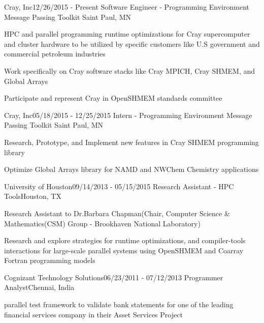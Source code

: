 \begin{rSubsection}{Cray, Inc}{12/26/2015 - Present}
                   {Software Engineer - Programming Environment Message Passing Toolkit}
                   {Saint Paul, MN}
\item HPC and parallel programming runtime optimizations for Cray supercomputer
      and cluster hardware to be utilized by specific customers like U.S
      government and commercial petroleum industries
\item Work specifically on Cray software stacks like Cray MPICH, Cray SHMEM, and
      Global Arrays
\item Participate and represent Cray in OpenSHMEM standards committee
\end{rSubsection}

\begin{rSubsection}{Cray, Inc}{05/18/2015 - 12/25/2015}
                   {Intern - Programming Environment Message Passing Toolkit}
                   {Saint Paul, MN}
\item Research, Prototype, and Implement new features in Cray SHMEM programming
      library
\item Optimize Global Arrays library for NAMD and NWChem Chemistry applications
\end{rSubsection}

\begin{rSubsection}{University of Houston}{09/14/2013 - 05/15/2015}
                   {Research Assistant - HPC Tools}{Houston, TX}
\item Research Assistant to Dr.Barbara Chapman(Chair, Computer Science
      \& Mathematics(CSM) Group - Brookhaven National Laboratory)
\item Research and explore strategies for runtime optimizations, and
      compiler-tools interactions for large-scale parallel systems using
      OpenSHMEM and Coarray Fortran programming models
\end{rSubsection}

\begin{rSubsection}{Cognizant Technology Solutions}{06/23/2011 - 07/12/2013}
                   {Programmer Analyst}{Chennai, India}
\item parallel test framework to validate bank statements for one of the leading
financial services company in their Asset Services Project
\end{rSubsection}
